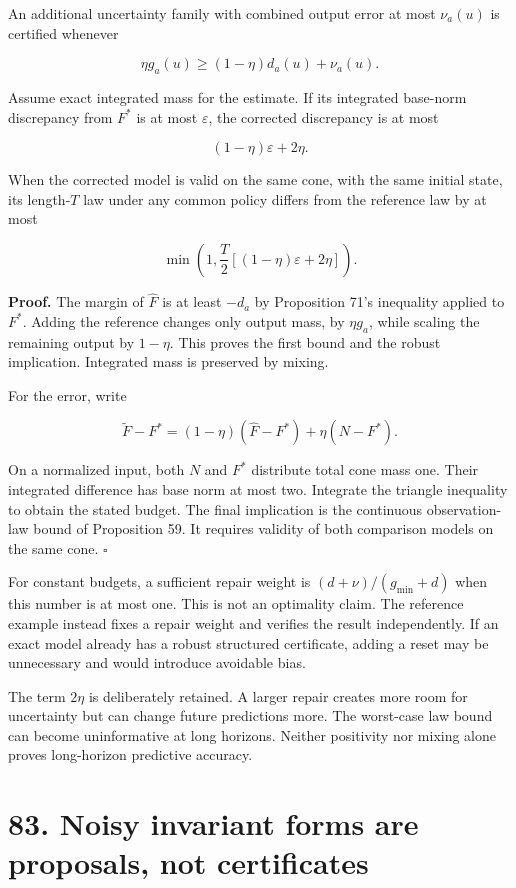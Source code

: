 \documentclass[11pt,letterpaper]{article}
\begin{document}
An additional uncertainty family with combined output error at most
\(\nu_a(u)\) is certified whenever

\[
\eta g_a(u)\geq(1-\eta)d_a(u)+\nu_a(u).
\]

Assume exact integrated mass for the estimate. If its integrated
base-norm discrepancy from \(F^*\) is at most \(\varepsilon\), the
corrected discrepancy is at most

\[
\boxed{(1-\eta)\varepsilon+2\eta.}
\]

When the corrected model is valid on the same cone, with the same
initial state, its length-\(T\) law under any common policy differs from
the reference law by at most

\[
\min\left(1,\frac T2[(1-\eta)\varepsilon+2\eta]\right).
\]

\textbf{Proof.} The margin of \(\widehat F\) is at least \(-d_a\) by
Proposition 71's inequality applied to \(F^*\). Adding the reference
changes only output mass, by \(\eta g_a\), while scaling the remaining
output by \(1-\eta\). This proves the first bound and the robust
implication. Integrated mass is preserved by mixing.

For the error, write

\[
\widetilde F-F^*=(1-\eta)(\widehat F-F^*)+\eta(N-F^*).
\]

On a normalized input, both \(N\) and \(F^*\) distribute total cone mass
one. Their integrated difference has base norm at most two. Integrate
the triangle inequality to obtain the stated budget. The final
implication is the continuous observation-law bound of Proposition 59.
It requires validity of both comparison models on the same cone.
\(\square\)

For constant budgets, a sufficient repair weight is
\((d+\nu)/(g_{\min}+d)\) when this number is at most one. This is not an
optimality claim. The reference example instead fixes a repair weight
and verifies the result independently. If an exact model already has a
robust structured certificate, adding a reset may be unnecessary and
would introduce avoidable bias.

The term \(2\eta\) is deliberately retained. A larger repair creates
more room for uncertainty but can change future predictions more. The
worst-case law bound can become uninformative at long horizons. Neither
positivity nor mixing alone proves long-horizon predictive accuracy.

\section{83. Noisy invariant forms are proposals, not
certificates}\label{noisy-invariant-forms-are-proposals-not-certificates}
\end{document}

